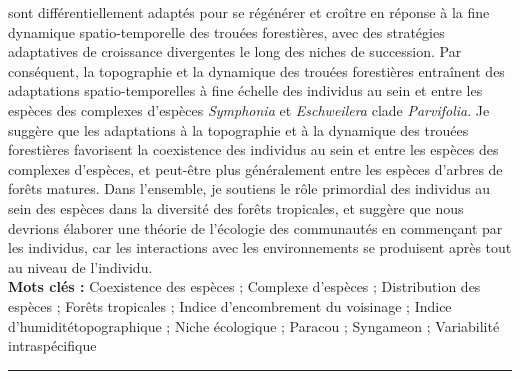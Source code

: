 \documentclass[12pt,twoside,a4paper, a]{article}
\begin{document}
{sont différentiellement adaptés pour se régénérer et croître en réponse à la fine dynamique spatio-temporelle des trouées forestières, avec des stratégies adaptatives de croissance  divergentes le long des niches de succession. Par conséquent, la topographie et la dynamique des trouées forestières entraînent des adaptations spatio-temporelles à fine échelle des individus au sein et entre les espèces des complexes d'espèces \emph{Symphonia} et \emph{Eschweilera} clade \emph{Parvifolia}. Je suggère que les adaptations à la topographie et à la dynamique des trouées forestières favorisent la coexistence des individus au sein et entre les espèces des complexes d'espèces, et peut-être plus généralement entre les espèces d'arbres de forêts matures. Dans l'ensemble, je soutiens le rôle primordial des individus au sein des espèces dans la diversité des forêts tropicales, et suggère que nous devrions élaborer une théorie de l'écologie des communautés en commençant par les individus, car les interactions avec les environnements se produisent après tout au niveau de l’individu. \\

  \textbf{Mots clés :}
  Coexistence des espèces ; Complexe d'espèces ; Distribution des espèces ; Forêts tropicales ; Indice d'encombrement du voisinage ; Indice d'humiditétopographique ; Niche écologique ; Paracou ; Syngameon ; Variabilité intraspécifique \vspace*{\baselineskip}
  \newline\noindent\rule{\textwidth}{0.7pt}

}
\end{document}
